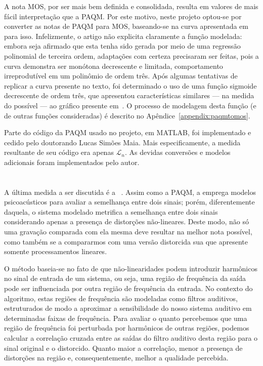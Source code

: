 A nota MOS, por ser mais bem definida e consolidada, resulta em valores de mais fácil interpretação que a PAQM. Por este motivo, neste projeto optou-se por converter as notas de PAQM para MOS, baseando-se na curva apresentada em~\cite{beerends-2002} para isso. Infelizmente, o artigo não explicita claramente a função modelada: embora seja afirmado que esta tenha sido gerada por meio de uma regressão polinomial de terceira ordem, adaptações com certeza precisaram ser feitas, pois a curva demonstra ser monótona decrescente e limitada, comportamento irreprodutível em um polinômio de ordem três. Após algumas tentativas de replicar a curva presente no texto, foi determinado o uso de uma função sigmoide decrescente de ordem três, que apresentou características similares --- na medida do possível --- ao gráfico presente em~\cite{beerends-2002}. O processo de modelagem desta função (e de outras funções consideradas) é descrito no Apêndice~\ref{appendix:paqmtomos}.

Parte do código da PAQM usado no projeto, em MATLAB, foi implementado e cedido pelo doutorando Lucas Simões Maia. Mais especificamente, a medida resultante de seu código era apenas $\mathcal{L}_n$. As devidas conversões e modelos adicionais foram implementados pelo autor.

\section{\texorpdfstring{\rnonlin{}}{Rnonlin}}
\label{section:metrics:rnonlin}

A última medida a ser discutida é a \rnonlin{}~\cite{tan-2004}. Assim como a PAQM, a \rnonlin{} emprega modelos psicoacústicos para avaliar a semelhança entre dois sinais; porém, diferentemente daquela, o sistema modelado metrifica a semelhança entre dois sinais considerando apenas a presença de distorções não-lineares. Deste modo, não só uma gravação comparada com ela mesma deve resultar na melhor nota possível, como também se a compararmos com uma versão distorcida sua que apresente somente processamentos lineares.

O método baseia-se no fato de que não-linearidades podem introduzir harmônicos no sinal de entrada de um sistema, ou seja, uma região de frequência da saída pode ser influenciada por outra região de frequência da entrada. No contexto do algoritmo, estas regiões de frequência são modeladas como filtros auditivos, estruturados de modo a aproximar a sensibilidade do nosso sistema auditivo em determinadas faixas de frequência. Para avaliar o quanto percebemos que uma região de frequência foi perturbada por harmônicos de outras regiões, podemos calcular a correlação cruzada entre as saídas do filtro auditivo desta região para o sinal original e o distorcido. Quanto maior a correlação, menor a presença de distorções na região e, consequentemente, melhor a qualidade percebida.

